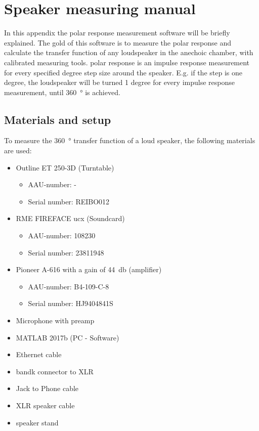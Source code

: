 \chapter*{Speaker measuring manual} \label{appendix:measuring_manual}
In this appendix the polar response measurement software will be briefly explained. The gold of this software is to measure the polar response and calculate the transfer function of any loudspeaker in the anechoic chamber, with calibrated measuring tools. polar response is an impulse response measurement for every specified degree step size around the speaker. E.g. if the step is one degree, the loudspeaker will be turned 1 degree for every  impulse response measurement, until \SI{360}{\degree} is achieved.

\section*{Materials and setup}
To measure the \SI{360}{\degree} transfer function of a loud speaker, the following materials are used:
\begin{itemize}
\item Outline ET 250-3D (Turntable)
\begin{itemize}[noitemsep]
\item AAU-number: -
\item Serial number: REIBO012
\end{itemize}
\item RME FIREFACE ucx (Soundcard)
\begin{itemize}[noitemsep]
\item AAU-number: 108230
\item Serial number: 23811948
\end{itemize}
\item Pioneer A-616 with a gain of \SI{44}{\decibel} (amplifier)
\begin{itemize}[noitemsep]
\item AAU-number: B4-109-C-8
\item Serial number: HJ9404841S
\end{itemize}
\item Microphone with preamp
\item MATLAB 2017b (PC - Software)
\item Ethernet cable 
\item \gls{bandk} connector to XLR
\item Jack to Phone cable
\item XLR speaker cable
\item speaker stand
\end{itemize}

